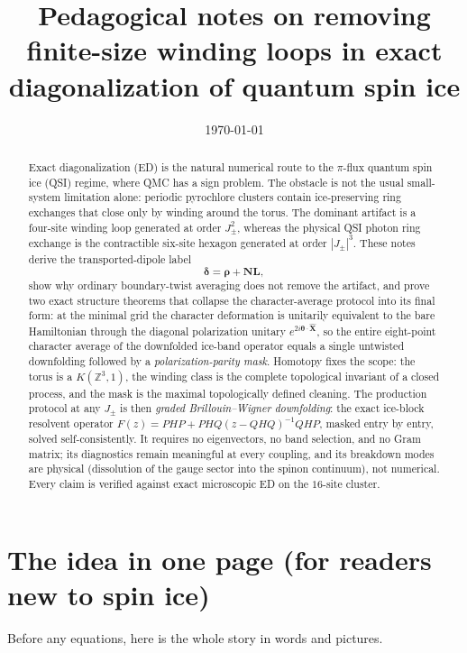 \documentclass[11pt,letterpaper]{article}
\title{Pedagogical notes on removing finite-size winding loops in exact
diagonalization of quantum spin ice}
\author{}
\date{\today}
\newcommand{\Jpm}{J_{\pm}}
\newcommand{\bN}{\bm N}
\newcommand{\bL}{\bm L}
\newcommand{\brho}{\bm \rho}
\newcommand{\bdelta}{\bm \delta}
\newcommand{\btheta}{\bm \theta}
\newcommand{\Z}{\mathbb Z}
\theoremstyle{plain}
\theoremstyle{definition}
\begin{document}
\maketitle

\begin{abstract}
Exact diagonalization (ED) is the natural numerical route to the $\pi$-flux
quantum spin ice (QSI) regime, where QMC has a sign problem.  The obstacle is
not the usual small-system limitation alone: periodic pyrochlore clusters
contain ice-preserving ring exchanges that close only by winding around the
torus.  The dominant artifact is a four-site winding loop generated at order
$\Jpm^2$, whereas the physical QSI photon ring exchange is the contractible
six-site hexagon generated at order $|\Jpm|^3$.  These notes derive the
transported-dipole label
\[
        \bdelta=\brho+\bN\bL,
\]
show why ordinary boundary-twist averaging does not remove the artifact, and
prove two exact structure theorems that collapse the character-average
protocol into its final form: at the minimal grid the character deformation is
unitarily equivalent to the bare Hamiltonian through the diagonal
polarization unitary $e^{2i\btheta\cdot\hat{\bm X}}$, so the entire
eight-point character average of the downfolded ice-band operator equals a
single untwisted downfolding followed by a \emph{polarization-parity mask}.
Homotopy fixes the scope: the torus is a $K(\Z^3,1)$, the winding class is
the complete topological invariant of a closed process, and the mask is the
maximal topologically defined cleaning.  The production protocol at any
$\Jpm$ is then \emph{graded Brillouin--Wigner downfolding}: the exact
ice-block resolvent operator $F(z)=PHP+PHQ(z-QHQ)^{-1}QHP$, masked entry by
entry, solved self-consistently.  It requires no eigenvectors, no band
selection, and no Gram matrix; its diagnostics remain meaningful at every
coupling, and its breakdown modes are physical (dissolution of the gauge
sector into the spinon continuum), not numerical.  Every claim is verified
against exact microscopic ED on the $16$-site cluster.
\end{abstract}

\tableofcontents

\section{The idea in one page (for readers new to spin ice)}

Before any equations, here is the whole story in words and pictures.
\end{document}
